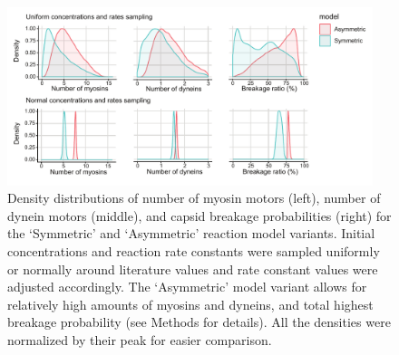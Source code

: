 \begin{figure}
\begin{center}
\includegraphics[width=0.95\textwidth, trim={0cm 0cm 0cm 0cm}, clip]{D_chapters/2_ReactionModel/densitiesRC.pdf}
\caption[Molecular motor and capsid breakage density distributions based on joined sampling of rates and concentrations]%
{Density distributions of number of myosin motors (left), number of dynein motors (middle), and capsid breakage probabilities (right) for the ‘Symmetric’ and ‘Asymmetric’ reaction model variants. Initial concentrations and reaction rate constants were sampled uniformly or normally around literature values and rate constant values were adjusted accordingly. The ‘Asymmetric’ model variant allows for relatively high amounts of myosins and dyneins, and total highest breakage probability (see Methods for details). All the densities were normalized by their peak for easier comparison.}
\label{figure:densitiesRC}
\end{center}
\end{figure}

